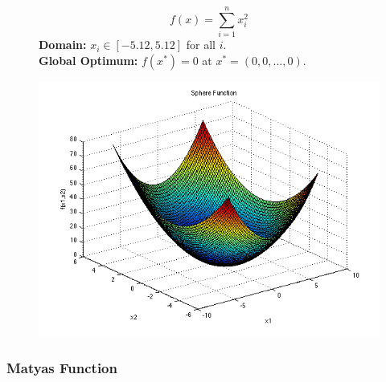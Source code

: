 \begin{figure}[H]
    \centering
    \begin{minipage}{0.65\textwidth}
        \begin{equation}
            f(x) = \sum_{i=1}^{n} x_i^2
        \end{equation}
        \textbf{Domain:} \( x_i \in [-5.12, 5.12] \) for all \( i \). \\
        \textbf{Global Optimum:} \( f(x^*) = 0 \) at \( x^* = (0,0,...,0) \).
    \end{minipage}
    \hfill
    \begin{minipage}{0.3\textwidth}
        \centering
        \includegraphics[width=\textwidth]{figures/sphere_function.png}
        \label{fig:sphere}
    \end{minipage}
\end{figure}

\subsubsection{Matyas Function}

